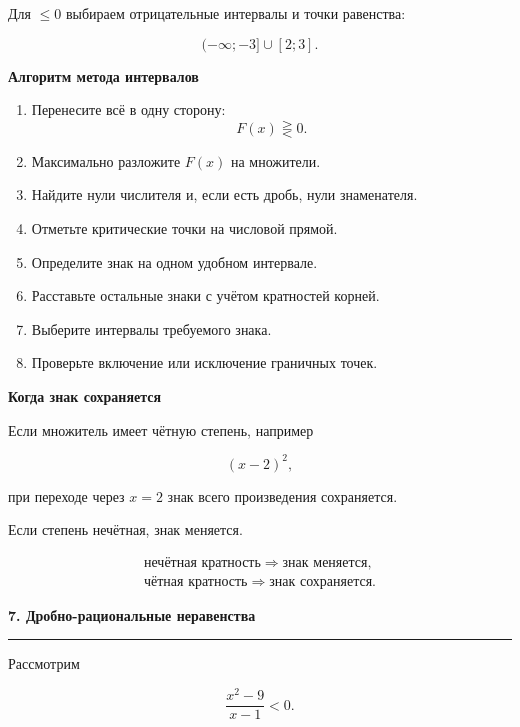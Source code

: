 \documentclass[a4paper,12pt]{article}
\newcommand{\topic}[1]{%
    \vspace{0.5em}
    {\Large\bfseries\textcolor{darkaccent}{#1}}\par
    \vspace{0.2em}
    {\color{accent}\rule{\linewidth}{0.7pt}}
    \vspace{0.5em}
}
\newcommand{\subtopic}[1]{%
    \vspace{0.5em}
    {\large\bfseries\textcolor{darkaccent}{#1}}\par
}
\begin{document}
Для \(\le0\) выбираем отрицательные интервалы и точки равенства:

\[
\boxed{(-\infty;-3]\cup[2;3]}.
\]

\subtopic{Алгоритм метода интервалов}

\begin{enumerate}
    \item Перенесите всё в одну сторону:
    \[
    F(x)\gtreqless0.
    \]

    \item Максимально разложите \(F(x)\) на множители.

    \item Найдите нули числителя и, если есть дробь, нули знаменателя.

    \item Отметьте критические точки на числовой прямой.

    \item Определите знак на одном удобном интервале.

    \item Расставьте остальные знаки с учётом кратностей корней.

    \item Выберите интервалы требуемого знака.

    \item Проверьте включение или исключение граничных точек.
\end{enumerate}

\subtopic{Когда знак сохраняется}

Если множитель имеет чётную степень, например

\[
(x-2)^2,
\]

при переходе через \(x=2\) знак всего произведения сохраняется.

Если степень нечётная, знак меняется.

\[
\boxed{
\begin{array}{c}
\text{нечётная кратность}\Rightarrow\text{знак меняется},\\[0.3em]
\text{чётная кратность}\Rightarrow\text{знак сохраняется}.
\end{array}
}
\]


\topic{7. Дробно-рациональные неравенства}

Рассмотрим

\[
\frac{x^2-9}{x-1}<0.
\]
\end{document}
